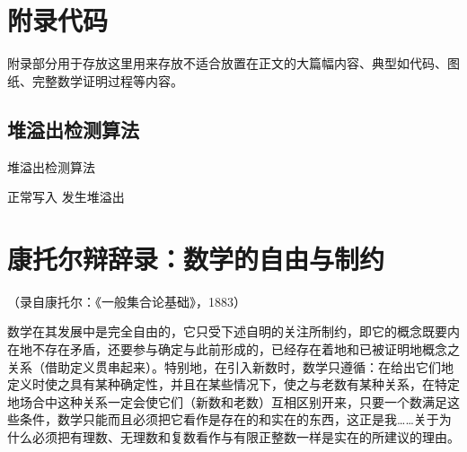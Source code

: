 %
%
%
%
%

\chapter{附录代码}

附录部分用于存放这里用来存放不适合放置在正文的大篇幅内容、典型如代码、图纸、完整数学证明过程等内容。

\section{堆溢出检测算法}

\begin{algorithm}[h]
    \caption{堆溢出检测算法}\label{alg:ovf}
    \begin{algorithmic}[1]
            \STATE 正常写入
            \STATE 发生堆溢出
        \ENDIF
    \end{algorithmic}
\end{algorithm}


\chapter{康托尔辩辞录：数学的自由与制约}

（录自康托尔：《一般集合论基础》，1883）

数学在其发展中是完全自由的，它只受下述自明的关注所制约，即它的概念既要内在地不存在矛盾，还要参与确定与此前形成的，已经存在着地和已被证明地概念之关系（借助定义贯串起来）。特别地，在引入新数时，数学只遵循：在给出它们地定义时使之具有某种确定性，并且在某些情况下，使之与老数有某种关系，在特定地场合中这种关系一定会使它们（新数和老数）互相区别开来，只要一个数满足这些条件，数学只能而且必须把它看作是存在的和实在的东西，这正是我……关于为什么必须把有理数、无理数和复数看作与有限正整数一样是实在的所建议的理由。

